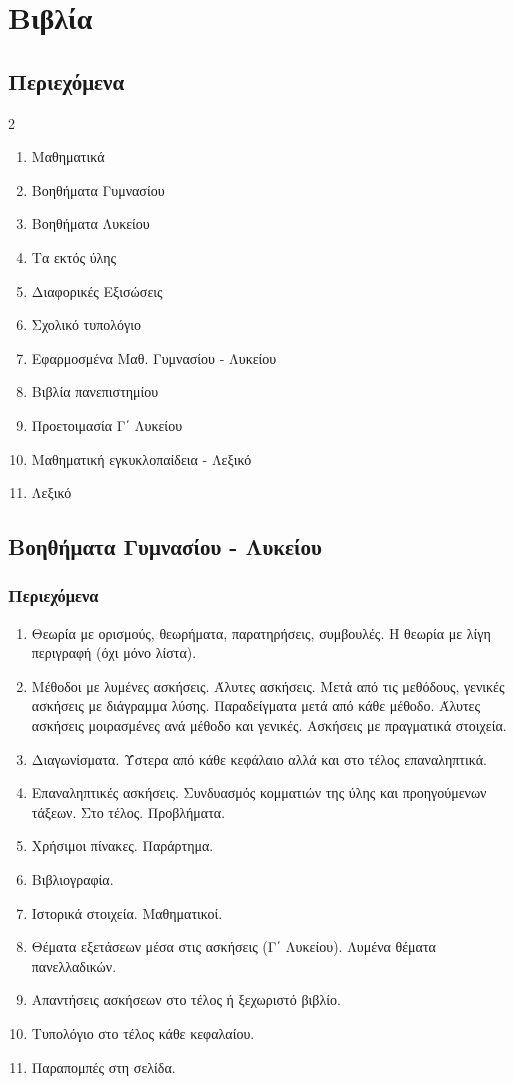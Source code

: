 \documentclass[11pt,a4paper]{book}
\begin{document}
\newpage
\chapter{Βιβλία}
\section{Περιεχόμενα}
\begin{multicols}{2}
\begin{enumerate}[itemsep=0mm]
\item Μαθηματικά
\item Βοηθήματα Γυμνασίου
\item Βοηθήματα Λυκείου
\item Τα εκτός ύλης
\item Διαφορικές Εξισώσεις
\item Σχολικό τυπολόγιο
\item Εφαρμοσμένα Μαθ. Γυμνασίου - Λυκείου
\item Βιβλία πανεπιστημίου
\item Προετοιμασία Γ΄ Λυκείου
\item Μαθηματική εγκυκλοπαίδεια - Λεξικό
\item Λεξικό 
\end{enumerate}
\end{multicols}
\section{Βοηθήματα Γυμνασίου - Λυκείου}
\subsection{Περιεχόμενα}
\begin{enumerate}
\item Θεωρία με ορισμούς, θεωρήματα, παρατηρήσεις, συμβουλές. Η θεωρία με λίγη περιγραφή (όχι μόνο λίστα).
\item Μέθοδοι με λυμένες ασκήσεις. Άλυτες ασκήσεις. Μετά από τις μεθόδους, γενικές ασκήσεις με διάγραμμα λύσης. Παραδείγματα μετά από κάθε μέθοδο. Άλυτες ασκήσεις μοιρασμένες ανά μέθοδο και γενικές. Ασκήσεις με πραγματικά στοιχεία.
\item Διαγωνίσματα. Ύστερα από κάθε κεφάλαιο αλλά και στο τέλος επαναληπτικά. 
\item Επαναληπτικές ασκήσεις. Συνδυασμός κομματιών της ύλης και προηγούμενων τάξεων. Στο τέλος. Προβλήματα.
\item Χρήσιμοι πίνακες. Παράρτημα.
\item Βιβλιογραφία.
\item Ιστορικά στοιχεία. Μαθηματικοί.
\item Θέματα εξετάσεων μέσα στις ασκήσεις (Γ΄ Λυκείου). Λυμένα θέματα πανελλαδικών.
\item Απαντήσεις ασκήσεων στο τέλος ή ξεχωριστό βιβλίο.
\item Τυπολόγιο στο τέλος κάθε κεφαλαίου.
\item Παραπομπές στη σελίδα.
\end{enumerate}
\end{document}
